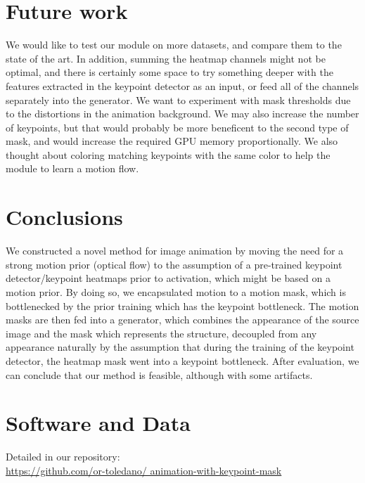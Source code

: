 \documentclass{article}
\begin{document}
\section{Future work}
\label{future}
We would like to test our module on more datasets, and compare them to the
state of the art. In addition, summing the heatmap channels might not be
optimal, and there is certainly some space to try something deeper with the
features extracted in the keypoint detector as an input, or feed all of the
channels separately into the generator. We want to experiment with
mask thresholds due to the distortions in the animation background.
We may also increase the number of keypoints, but that would probably be
more beneficent to the second type of mask, and would increase the
required GPU memory proportionally. We also thought about coloring
matching keypoints with the same color to help the module to learn a motion
flow.

\section{Conclusions}
We constructed a novel method for image animation by moving the need for
a strong motion prior (optical flow) to the assumption of a pre-trained
keypoint detector/keypoint heatmaps prior to activation, which might be
based on a motion prior.
By doing so, we encapsulated motion to a motion mask, which is
bottlenecked by the prior training which has the keypoint bottleneck.
The motion masks are then fed into a generator, which combines the
appearance of the source image and the mask which represents the structure,
decoupled from any appearance naturally by the assumption that during the
training of the keypoint detector, the heatmap mask went into a keypoint
bottleneck. After evaluation, we can conclude that our method is
feasible, although with some artifacts.
\section*{Software and Data}
Detailed in our repository:
\\
\url{https://github.com/or-toledano/
animation-with-keypoint-mask}


\end{document}

